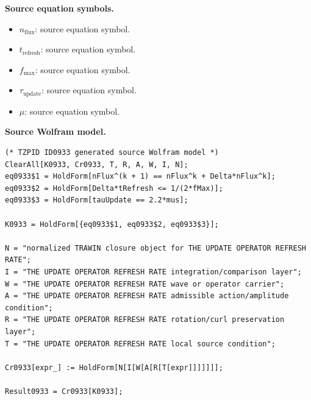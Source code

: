 \begin{minipage}[t]{0.49\linewidth}
\begingroup
\small
\raggedright
\textbf{Source equation symbols.}\par
\begin{itemize}[leftmargin=1.35em,itemsep=1pt,topsep=1pt,parsep=0pt]
    \item $n_{\mathrm{flux}}$: source equation symbol.
    \item $t_{\mathrm{refresh}}$: source equation symbol.
    \item $f_{\max}$: source equation symbol.
    \item $\tau_{\mathrm{update}}$: source equation symbol.
    \item $\mu$: source equation symbol.
\end{itemize}
\endgroup
\end{minipage}\hfill
\begin{minipage}[t]{0.47\linewidth}
\begingroup
\scriptsize
\raggedright
\textbf{Source Wolfram model.}\par
\begin{Verbatim}[fontsize=\tiny,breaklines=true,breakanywhere=true]
(* TZPID ID0933 generated source Wolfram model *)
ClearAll[K0933, Cr0933, T, R, A, W, I, N];
eq0933$1 = HoldForm[nFlux^(k + 1) == nFlux^k + Delta*nFlux^k];
eq0933$2 = HoldForm[Delta*tRefresh <= 1/(2*fMax)];
eq0933$3 = HoldForm[tauUpdate == 2.2*mus];

K0933 = HoldForm[{eq0933$1, eq0933$2, eq0933$3}];

N = "normalized TRAWIN closure object for THE UPDATE OPERATOR REFRESH RATE";
I = "THE UPDATE OPERATOR REFRESH RATE integration/comparison layer";
W = "THE UPDATE OPERATOR REFRESH RATE wave or operator carrier";
A = "THE UPDATE OPERATOR REFRESH RATE admissible action/amplitude condition";
R = "THE UPDATE OPERATOR REFRESH RATE rotation/curl preservation layer";
T = "THE UPDATE OPERATOR REFRESH RATE local source condition";

Cr0933[expr_] := HoldForm[N[I[W[A[R[T[expr]]]]]]];

Result0933 = Cr0933[K0933];
\end{Verbatim}
\endgroup
\end{minipage}


